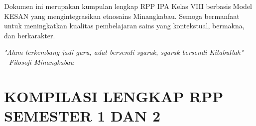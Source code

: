\documentclass[12pt,a4paper]{article}
\begin{document}
\vfill
\begin{center}
\begin{tcolorbox}[enhanced,
    colback=lightgray!30,
    colframe=black,
    boxrule=2pt,
    arc=5mm,
    width=13cm,
    title={\centering\textbf{\large PENUTUP}},
    fonttitle=\bfseries,
    coltitle=white,
    colbacktitle=darkgray]
\centering
{\fontsize{11}{14}\selectfont Dokumen ini merupakan kumpulan lengkap RPP IPA Kelas VIII berbasis Model KESAN yang mengintegrasikan etnosains Minangkabau. Semoga bermanfaat untuk meningkatkan kualitas pembelajaran sains yang kontekstual, bermakna, dan berkarakter.}

\vspace{0.3cm}

{\fontsize{10}{12}\selectfont\textit{"Alam terkembang jadi guru, adat bersendi syarak, syarak bersendi Kitabullah"}}\\
{\fontsize{9}{11}\selectfont\textit{- Filosofi Minangkabau -}}
\end{tcolorbox}
\end{center}

\clearpage
\section*{\centering KOMPILASI LENGKAP RPP SEMESTER 1 DAN 2}
\begingroup
\setlength{\parskip}{0pt}
\setlength{\parindent}{0pt}

\newcommand{\rppsectionpage}[2]{%
    \clearpage
    \thispagestyle{empty}%
    \vspace*{6cm}
    \begin{center}
        \tikz[remember picture,overlay] \node[fill=lightgray!20,rounded corners=8pt,minimum width=18cm,minimum height=8cm] at (current page.center) {};
        
        \parbox{16cm}{\centering
            {\fontsize{28}{34}\selectfont\textbf{#1}}
            
            \vspace{2cm}
            
            {\fontsize{20}{24}\selectfont\textbf{(Pertemuan #2)}}
        }
    \end{center}
    \clearpage
    \setcounter{page}{1}%
}
\end{document}
